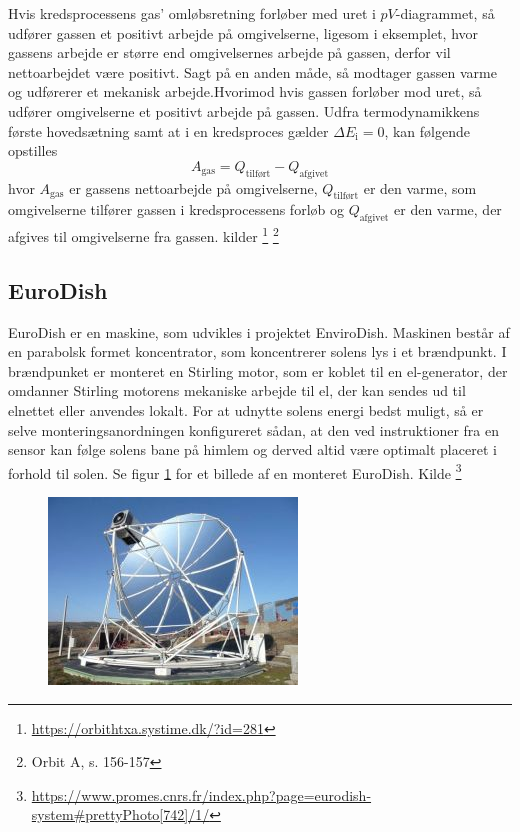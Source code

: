 \documentclass[SRC.tex]{subfiles}
\begin{document}
	Hvis kredsprocessens gas' omløbsretning forløber med uret i \(pV\)-diagrammet, 
	så udfører gassen et positivt arbejde på omgivelserne, ligesom i eksemplet, 
	hvor gassens arbejde er større end omgivelsernes arbejde på gassen, derfor vil 
	nettoarbejdet være positivt. Sagt på en anden måde, så modtager gassen varme og 
	udførerer et mekanisk arbejde.Hvorimod hvis gassen forløber mod uret, så udfører 
	omgivelserne et positivt arbejde på gassen. Udfra termodynamikkens første 
	hovedsætning samt at i en kredsproces gælder \(\Delta E_\text{i} = 0\), kan 
	følgende opstilles
	\begin{equation}
	A_{\text{gas}} = Q_{\text{tilført}} - Q_{\text{afgivet}}
	\end{equation} 
	hvor \(A_{\text{gas}}\) er gassens nettoarbejde på omgivelserne, 
	\(Q_{\text{tilført}}\) er den varme, som omgivelserne tilfører gassen i 
	kredsprocessens forløb og \(Q_{\text{afgivet}}\) er den varme, der afgives 
	til omgivelserne fra gassen. kilder \footnote{\url{https://orbithtxa.systime.dk/?id=281}}
	\footnote{Orbit A, s. 156-157}
	
	\subsection{EuroDish}
	EuroDish er en maskine, som udvikles i projektet EnviroDish. Maskinen består
	af en parabolsk formet koncentrator, som koncentrerer solens lys i et brændpunkt. 
	I brændpunket er monteret en Stirling motor, som er koblet til en el-generator,
	der omdanner Stirling motorens mekaniske arbejde til el, der kan sendes ud til 
	elnettet eller anvendes lokalt. For at udnytte solens energi bedst muligt, så er
	selve monteringsanordningen konfigureret sådan, at den ved instruktioner fra en 
	sensor kan følge solens bane på himlem og derved altid være optimalt placeret i forhold til solen. Se figur \ref{fig:744-9} for et billede af en 
	monteret EuroDish. Kilde \footnote{\url{https://www.promes.cnrs.fr/index.php?page=eurodish-system#prettyPhoto[742]/1/}}
	\begin{figure}[h]
		\centering
		\includegraphics[scale=0.6]{Billeder/744-9}
		\caption{}
		\label{fig:744-9}
	\end{figure}
\end{document}

